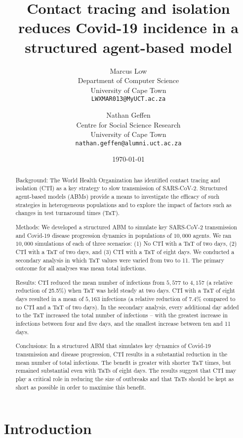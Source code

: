 \documentclass{article}
\title{Contact tracing and isolation reduces Covid-19 incidence in a structured agent-based model}
\author{
  Marcus Low \\
  Department of Computer Science \\
  University of Cape Town\\
  \texttt{LWXMAR013@MyUCT.ac.za} \\
  \and
  Nathan Geffen \\
  Centre for Social Science Research \\
  University of Cape Town\\
  \texttt{nathan.geffen@alumni.uct.ac.za}}
\date{\today}
\begin{document}
\maketitle

\begin{abstract}

Background: The World Health Organization has identified contact tracing and
isolation (CTI) as a key strategy to slow transmission of SARS-CoV-2. Structured
agent-based models (ABMs) provide a means to investigate the efficacy of such
strategies in heterogeneous populations and to explore the impact of factors
such as changes in test turnaround times (TaT).

Methods: We developed a structured ABM to simulate key SARS-CoV-2 transmission
and Covid-19 disease progression dynamics in populations of $10,000$ agents. We
ran $10,000$ simulations of each of three scenarios: (1) No CTI with a TaT of
two days, (2) CTI with a TaT of two days, and (3) CTI with a TaT of eight days. We
conducted a secondary analysis in which TaT values were varied from two to 11. The
primary outcome for all analyses was mean total infections.

Results: CTI reduced the mean number of infections from $5,577$ to $4,157$ (a
relative reduction of 25.5\%) when TaT was held steady at two days. CTI with a
TaT of eight days resulted in a mean of $5,163$ infections (a relative reduction
of 7.4\% compared to no CTI and a TaT of two days). In the secondary analysis,
every additional day added to the TaT increased the total number of infections –
with the greatest increase in infections between four and five days, and the
smallest increase between ten and 11 days.

Conclusions: In a structured ABM that simulates key dynamics of Covid-19
transmission and disease progression, CTI results in a substantial reduction in
the mean number of total infections. The benefit is greater with shorter TaT
times, but remained substantial even with TaTs of eight days. The results
suggest that CTI may play a critical role in reducing the size of outbreaks and
that TaTs should be kept as short as possible in order to maximise this benefit.

\end{abstract}


\section{Introduction}
\end{document}
